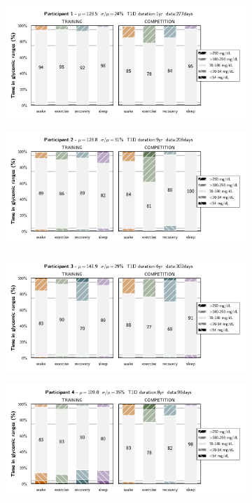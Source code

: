 \documentclass[11pt,a4paper]{article}
\begin{document}
\begin{figure}[h]
    \centering
    \caption{Time in glycemic ranges per participant for training and competition days}
    \label{fig:time-in-zones-participants}
    \begin{subfigure}{\textwidth}
        \centering
        \includegraphics[width=.75\textwidth]{figure/time_in_zone/time_in_glucoselevel_traincomp_1.pdf}
    \end{subfigure}\vfill
    \begin{subfigure}{\textwidth}
        \centering
        \includegraphics[width=.75\textwidth]{figure/time_in_zone/time_in_glucoselevel_traincomp_2.pdf}
    \end{subfigure}\vfill
    \begin{subfigure}{\textwidth}
        \centering
        \includegraphics[width=.75\textwidth]{figure/time_in_zone/time_in_glucoselevel_traincomp_3.pdf}
    \end{subfigure}\vfill
    \begin{subfigure}{\textwidth}
        \centering
        \includegraphics[width=.75\textwidth]{figure/time_in_zone/time_in_glucoselevel_traincomp_4.pdf}
    \end{subfigure}\vfill
\end{figure}
\end{document}
